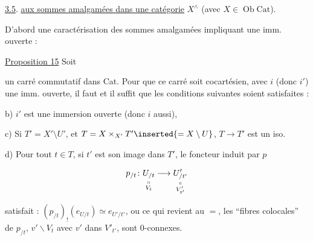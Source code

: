
\uline{3.5}. \uline{ aux sommes amalgamées dans une catégorie} $X^\wedge$ (avec $X\in\operatorname{Ob}\mathrm{Cat}$).

D'abord une caractérisation des sommes amalgamées impliquant une imm. ouverte :

\uline{Proposition 15} Soit


un carré commutatif dans Cat. Pour que ce carré soit cocartésien, avec $i$ (donc $i'$) une imm. ouverte, il faut et il suffit que les conditions suivantes soient satisfaites :


b) $i'$ est une immersion ouverte (donc $i$ aussi),


c) Si $T'=X'\setminus U'$, et $T=X\times_{X'}T'\inserted{=X\setminus U}$, $T\longrightarrow T'$ est un iso.

d) Pour tout $t\in T$, si $t'$ est son image dans $T'$, le foncteur induit par $p$

\[
p_{/t}\colon
\underset{\substack{\shortparallel\\ V_t}}{U_{/t}}
\longrightarrow
\underset{\substack{\shortparallel\\ V'_{t'}}}{U'_{/t'}}
\]

  satisfait : $(p_{/t})_!(e_{U/t})\simeq e_{U'/t'}$, ou ce qui revient au $=$, les ``fibres colocales'' de $p_{/t}$, $v'\backslash V_t$ avec $v'$ dans $V'_{t'}$, sont $0$-connexes.
